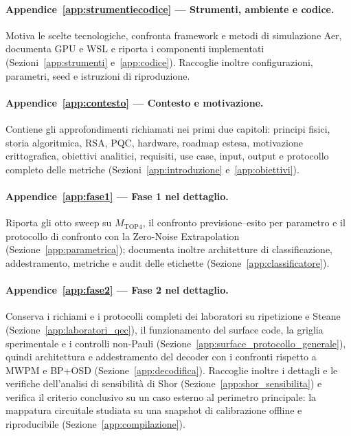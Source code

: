 \begin{onehalfspace}
\paragraph{Appendice~\ref{app:strumentiecodice} --- Strumenti, ambiente e codice.}
Motiva le scelte tecnologiche, confronta framework e metodi di simulazione Aer, documenta GPU e WSL e riporta i componenti implementati (Sezioni~\ref{app:strumenti} e~\ref{app:codice}). Raccoglie inoltre configurazioni, parametri, seed e istruzioni di riproduzione.

\paragraph{Appendice~\ref{app:contesto} --- Contesto e motivazione.}
Contiene gli approfondimenti richiamati nei primi due capitoli: principi fisici, storia algoritmica, RSA, \ac{PQC}, hardware, roadmap estesa, motivazione crittografica, obiettivi analitici, requisiti, use case, input, output e protocollo completo delle metriche (Sezioni~\ref{app:introduzione} e~\ref{app:obiettivi}).

\paragraph{Appendice~\ref{app:fase1} --- Fase 1 nel dettaglio.}
Riporta gli otto sweep su $M_{\mathrm{TOP4}}$, il confronto previsione--esito per parametro e il protocollo di confronto con la Zero-Noise Extrapolation (Sezione~\ref{app:parametrica}); documenta inoltre architetture di classificazione, addestramento, metriche e audit delle etichette (Sezione~\ref{app:classificatore}).

\paragraph{Appendice~\ref{app:fase2} --- Fase 2 nel dettaglio.}
Conserva i richiami e i protocolli completi dei laboratori su ripetizione e Steane
(Sezione~\ref{app:laboratori_qec}), il funzionamento del surface code, la griglia
sperimentale e i controlli non-Pauli (Sezione~\ref{app:surface_protocollo_generale}),
quindi architettura e addestramento del decoder con i confronti rispetto a \ac{MWPM}
e BP+OSD (Sezione~\ref{app:decodifica}). Raccoglie inoltre i dettagli e le verifiche
dell'analisi di sensibilità di Shor (Sezione~\ref{app:shor_sensibilita}) e verifica
il criterio conclusivo su un caso esterno al perimetro principale: la mappatura
circuitale studiata su una snapshot di calibrazione offline e riproducibile
(Sezione~\ref{app:compilazione}).

\end{onehalfspace}
